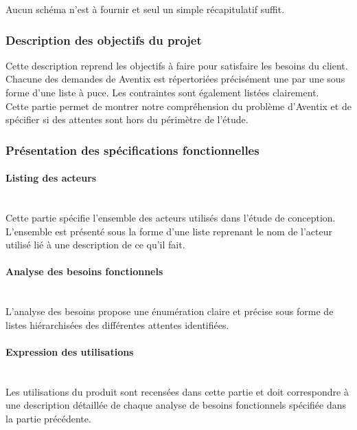 Aucun schéma n'est à fournir et seul un simple récapitulatif suffit. \\

\subsubsection{Description des objectifs du projet}
Cette description reprend les objectifs à faire pour satisfaire les besoins du
client. \\

Chacune des demandes de Aventix est répertoriées précisément une par une sous
forme d'une liste à puce. Les contraintes sont également listées clairement. \\

Cette partie permet de montrer notre compréhension du problème d'Aventix et de
spécifier si des attentes sont hors du périmètre de l'étude. \\

\subsubsection{Présentation des spécifications fonctionnelles}
\paragraph{Listing des acteurs}
~\\
Cette partie spécifie l'ensemble des acteurs utilisés dans l'étude de conception. \\

L'ensemble est présenté sous la forme d'une liste reprenant le nom de l'acteur
utilisé lié à une description de ce qu'il fait. \\

\paragraph{Analyse des besoins fonctionnels}
~\\
L'analyse des besoins propose une énumération claire et précise sous forme de
listes hiérarchisées des différentes attentes identifiées. \\

\paragraph{Expression des utilisations}
~\\
Les utilisations du produit sont recensées dans cette partie et doit
correspondre à une description détaillée de chaque analyse de besoins
fonctionnels spécifiée dans la partie précédente. \\

